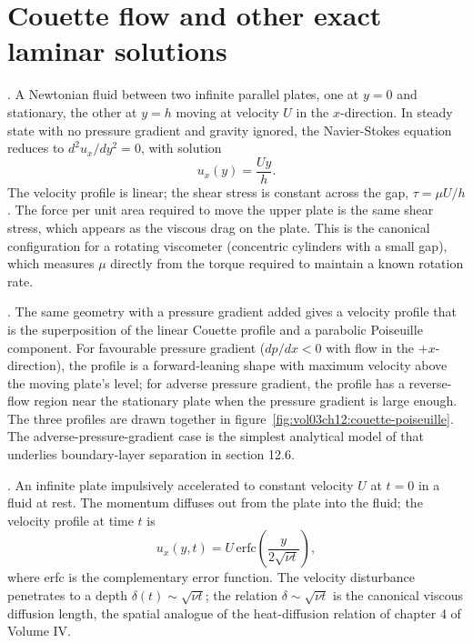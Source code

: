 

\section{Couette flow and other exact laminar solutions}

. A Newtonian fluid between two infinite
parallel plates, one at $y = 0$ and stationary, the other at
$y = h$ moving at velocity $U$ in the $x$-direction. In steady
state with no pressure gradient and gravity ignored, the
Navier-Stokes equation reduces to $d^2 u_x/dy^2 = 0$, with
solution
\[
u_x(y) = \frac{U y}{h}.
\]
The velocity profile is linear; the shear stress is constant
across the gap, $\tau = \mu U/h$. The force per unit area required
to move the upper plate is the same shear stress, which appears as
the viscous drag on the plate. This is the canonical configuration
for a rotating viscometer (concentric cylinders with a small gap),
which measures $\mu$ directly from the torque required to
maintain a known rotation rate.

. The same geometry with
a pressure gradient added gives a velocity profile that is the
superposition of the linear Couette profile and a parabolic
Poiseuille component. For favourable pressure gradient
($dp/dx < 0$ with flow in the $+x$-direction), the profile is a
forward-leaning shape with maximum velocity above the moving
plate's level; for adverse pressure gradient, the profile has a
reverse-flow region near the stationary plate when the pressure
gradient is large enough. The three profiles are drawn together in
figure~\ref{fig:vol03ch12:couette-poiseuille}. The
adverse-pressure-gradient case is
the simplest analytical model of  that
underlies boundary-layer separation in section 12.6.



. An infinite plate impulsively
accelerated to constant velocity $U$ at $t = 0$ in a fluid at
rest. The momentum diffuses out from the plate into the fluid; the
velocity profile at time $t$ is
\[
u_x(y, t) = U\,\text{erfc}\left(\frac{y}{2\sqrt{\nu t}}\right),
\]
where erfc is the complementary error function. The velocity
disturbance penetrates to a depth $\delta(t) \sim \sqrt{\nu t}$;
the relation $\delta \sim \sqrt{\nu t}$ is the canonical viscous
diffusion length, the spatial analogue of the heat-diffusion
relation of chapter 4 of Volume IV.

